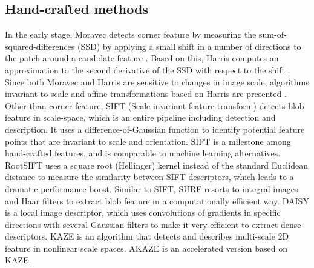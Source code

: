 \subsection{Hand-crafted methods}
In the early stage, Moravec detects corner feature by measuring the sum-of-squared-differences (SSD) by applying a small shift in a number of directions to the patch around a candidate feature \cite{moravec1980obstacle}. Based on this, Harris computes an approximation to the second derivative of the SSD with respect to the shift \cite{harris1988combined}. Since both Moravec and Harris are sensitive to changes in image scale, algorithms invariant to scale and affine transformations based on Harris are presented \cite{mikolajczyk2004scale}. Other than corner feature, SIFT (Scale-invariant feature transform) \cite{lowe2004distinctive} detects blob feature in scale-space, which is an entire pipeline including detection and description. It uses a difference-of-Gaussian function to identify potential feature points that are invariant to scale and orientation. SIFT is a milestone among hand-crafted features, and is comparable to machine learning alternatives. RootSIFT \cite{arandjelovic2012three} uses a square root (Hellinger) kernel instead of the standard Euclidean distance to measure the similarity between SIFT descriptors, which leads to a dramatic performance boost. Similar to SIFT, SURF \cite{bay2006surf} resorts to integral images and Haar filters to extract blob feature in a computationally efficient way. DAISY \cite{tola2009daisy} is a local image descriptor, which uses convolutions of gradients in specific directions with several Gaussian filters to make it very efficient to extract dense descriptors. KAZE \cite{alcantarilla2012kaze} is an algorithm that detects and describes multi-scale 2D feature in nonlinear scale spaces. AKAZE \cite{Alcantarilla13bmvc} is an accelerated version based on KAZE.
